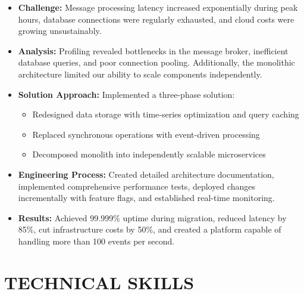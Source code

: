 \documentclass{fullstackdeveloper-ats}
\begin{document}
\begin{itemize}
    \item \textbf{Challenge:} Message processing latency increased exponentially during peak hours, database connections were regularly exhausted, and cloud costs were growing unsustainably.
    
    \item \textbf{Analysis:} Profiling revealed bottlenecks in the message broker, inefficient database queries, and poor connection pooling. Additionally, the monolithic architecture limited our ability to scale components independently.
    
    \item \textbf{Solution Approach:} Implemented a three-phase solution:
    \begin{itemize}
        \item Redesigned data storage with time-series optimization and query caching
        \item Replaced synchronous operations with event-driven processing
        \item Decomposed monolith into independently scalable microservices
    \end{itemize}
    
    \item \textbf{Engineering Process:} Created detailed architecture documentation, implemented comprehensive performance tests, deployed changes incrementally with feature flags, and established real-time monitoring.
    
    \item \textbf{Results:} Achieved 99.999\% uptime during migration, reduced latency by 85\%, cut infrastructure costs by 50\%, and created a platform capable of handling more than 100 events per second.
\end{itemize}

\section{TECHNICAL SKILLS}
\end{document}
